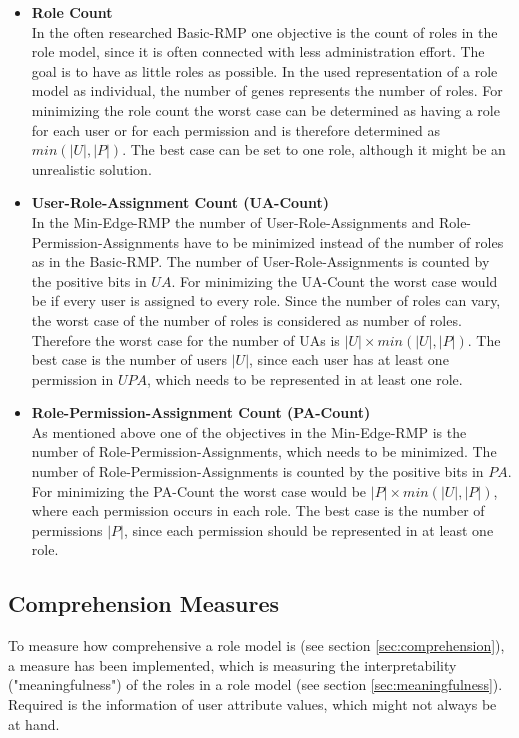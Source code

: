     \begin{itemize}
    	\item \textbf{Role Count}\\
    	In the often researched Basic-RMP one objective is the count of roles in the role model, since it is often connected with less administration effort. The goal is to have as little roles as possible. In the used representation of a role model as individual, the number of genes represents the number of roles.
    	For minimizing the role count the worst case can be determined as having a role for each user or for each permission and is therefore determined as $min(|U|,|P|)$. The best case can be set to one role, although it might be an unrealistic solution.
    	
    	\item \textbf{User-Role-Assignment Count (UA-Count)}\\
    	In the Min-Edge-RMP the number of User-Role-Assignments and Role-Permission-Assignments have to be minimized instead of the number of roles as in the Basic-RMP. The number of User-Role-Assignments is counted by the positive bits in $UA$. 
    	For minimizing the UA-Count the worst case would be if every user is assigned to every role. Since the number of roles can vary, the worst case of the number of roles is considered as number of roles. Therefore the worst case for the number of UAs is $|U| \times min(|U|,|P|)$. The best case is the number of users $|U|$, since each user has at least one permission in $UPA$, which needs to be represented in at least one role.
    	
    	\item \textbf{Role-Permission-Assignment Count (PA-Count)}\\
    	As mentioned above one of the objectives in the Min-Edge-RMP is the number of Role-Permission-Assignments, which needs to be minimized. The number of Role-Permission-Assignments is counted by the positive bits in $PA$.
    	For minimizing the PA-Count the worst case would be $|P| \times min(|U|,|P|)$, where each permission occurs in each role. The best case is the number of permissions $|P|$, since each permission should be represented in at least one role.
    \end{itemize}
    
    \subsection{Comprehension Measures}
    \label{sec:optimizationComprehension}
    To measure how comprehensive a role model is (see section \ref{sec:comprehension}), a measure has been implemented, which is measuring the interpretability ("meaningfulness") of the roles in a role model (see section \ref{sec:meaningfulness}). Required is the information of user attribute values, which might not always be at hand.
    
